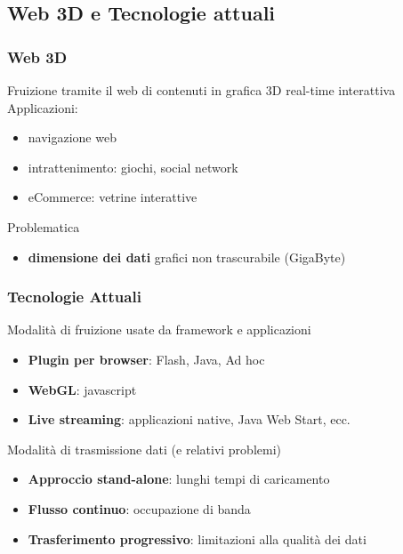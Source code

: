 \documentclass[ignorenonframetext,8pt]{beamer}
\begin{document}
	\subsection{Web 3D e Tecnologie attuali}
	\begin{frame}
		\frametitle{Web 3D}
		\begin{block}{Fruizione tramite il web di contenuti in grafica 3D real-time interattiva}
			Applicazioni:
			\begin{itemize}
					\item navigazione web
					\item intrattenimento: giochi, social network
					\item eCommerce: vetrine interattive
			\end{itemize}
		\end{block}

		\begin{block}{Problematica}
			\begin{itemize}
					\item \textbf{dimensione dei dati} grafici non trascurabile (GigaByte)
			\end{itemize}
		\end{block}
	\end{frame}

	\begin{frame}
		\frametitle{Tecnologie Attuali}
		\begin{block}{Modalit\`a di fruizione usate da framework e applicazioni}
			\begin{itemize}
				\item \textbf{Plugin per browser}: Flash, Java, Ad hoc
				\item \textbf{WebGL}: javascript
				\item \textbf{Live streaming}: applicazioni native, Java Web Start, ecc.
			\end{itemize}
		\end{block}
		\begin{block}{Modalit\`a di trasmissione dati (e relativi problemi)}
			\begin{itemize}
				\item \textbf{Approccio stand-alone}: lunghi tempi di caricamento
				\item \textbf{Flusso continuo}: occupazione di banda
				\item \textbf{Trasferimento progressivo}: limitazioni alla qualit\`a dei dati
			\end{itemize}
		\end{block}
	\end{frame}
\end{document}
